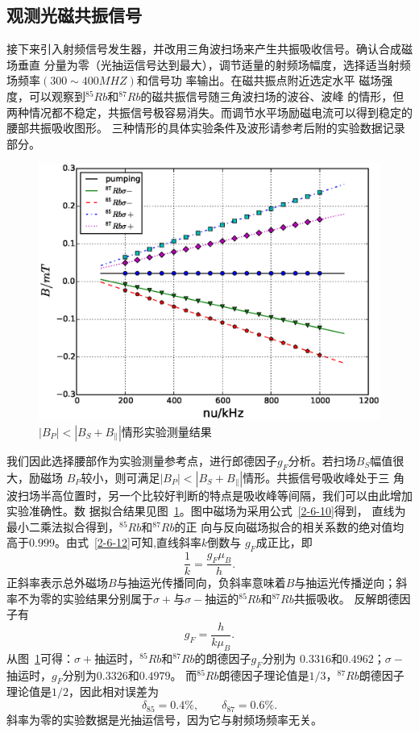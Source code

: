 \documentclass[11pt,a4paper]{article}
\begin{document}
\begin{spacing}{1.3}
\begin{CJK*}{UTF8}{gbsn}
\subsection{观测光磁共振信号}
接下来引入射频信号发生器，并改用三角波扫场来产生共振吸收信号。确认合成磁场垂直
分量为零（光抽运信号达到最大），调节适量的射频场幅度，选择适当射频场频率$(300\sim 400MHZ)$和信号功
率输出。在磁共振点附近选定水平
磁场强度，可以观察到$^{85}Rb$和$^{87}Rb$的磁共振信号随三角波扫场的波谷、波峰
的情形，但两种情况都不稳定，共振信号极容易消失。而调节水平场励磁电流可以得到稳定的腰部共振吸收图形。
三种情形的具体实验条件及波形请参考后附的实验数据记录部分。\par 
\begin{figure}[ht]
\centering
\includegraphics[width=.8\textwidth]{1112a}
\caption{$|B_P|<|B_S+B_{\parallel}|$情形实验测量结果}
\label{fig:gf}
\end{figure}
我们因此选择腰部作为实验测量参考点，进行郎德因子$g_F$分析。若扫场$B_S$幅值很大，励磁场
$B_P$较小，则可满足$|B_P|<|B_S+B_{\parallel}|$情形。共振信号吸收峰处于三
角波扫场半高位置时，另一个比较好判断的特点是吸收峰等间隔，我们可以由此增加实验准确性。数
据拟合结果见图~\ref{fig:gf}。图中磁场为采用公式~\eqref{2-6-10}得到，
直线为最小二乘法拟合得到，$^{85}Rb$和$^{87}Rb$的正
向与反向磁场拟合的相关系数的绝对值均高于$0.999$。由式~\eqref{2-6-12}可知,直线斜率$k$倒数与
$g_F$成正比，即
\begin{equation}
\frac{1}{k} = \frac{g_F\mu_B}{h}.
\end{equation}
正斜率表示总外磁场$B$与抽运光传播同向，负斜率意味着$B$与抽运光传播逆向；斜
率不为零的实验结果分别属于$\sigma +$与$\sigma -$抽运的$^{85}Rb$和$^{87}Rb$共振吸收。
反解朗德因子有
\begin{equation}
g_F = \frac{h}{k \mu_B}.
\end{equation}
从图~\ref{fig:gf}可得：$\sigma +$抽运时，$^{85}Rb$和$^{87}Rb$的朗德因子$g_F$分别为
$0.3316$和$0.4962$；$\sigma -$抽运时，$g_F$分别为$0.3326$和$0.4979$。
而$^{85}Rb$朗德因子理论值是$1/3$，$^{87}Rb$朗德因子理论值是$1/2$，因此相对误差为
\begin{equation}
\delta_{85} = 0.4\%,\qquad \delta_{87} = 0.6\%.
\end{equation}
斜率为零的实验数据是光抽运信号，因为它与射频场频率无关。


\end{CJK*}
\end{spacing}
\end{document}
